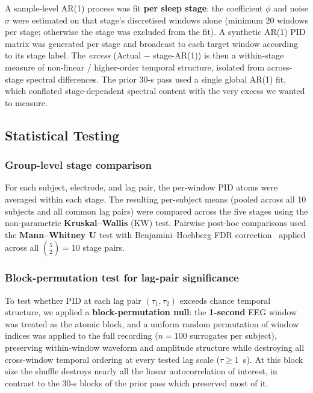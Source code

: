 \documentclass[11pt,a4paper]{article}
\begin{document}
A sample-level AR(1) process was fit \textbf{per sleep stage}: the
coefficient $\phi$ and noise $\sigma$ were estimated on that stage's
discretised windows alone (minimum 20 windows per stage; otherwise the stage
was excluded from the fit).  A synthetic AR(1) PID matrix was generated per
stage and broadcast to each target window according to its stage label.
The \emph{excess} (Actual $-$ stage-AR(1)) is then a within-stage measure of
non-linear / higher-order temporal structure, isolated from across-stage
spectral differences.  The prior 30-s pass used a single global AR(1) fit,
which conflated stage-dependent spectral content with the very excess we
wanted to measure.

\subsection{Statistical Testing}

\subsubsection{Group-level stage comparison}

For each subject, electrode, and lag pair, the per-window PID atoms were
averaged within each stage.  The resulting per-subject means (pooled across
all 10 subjects and all common lag pairs) were compared across the five
stages using the non-parametric \textbf{Kruskal--Wallis} (KW) test.
Pairwise post-hoc comparisons used the \textbf{Mann--Whitney U} test with
Benjamini--Hochberg FDR correction~\citep{benjamini1995fdr} applied across
all $\binom{5}{2} = 10$ stage pairs.

\subsubsection{Block-permutation test for lag-pair significance}
\label{sec:blockperm}

To test whether PID at each lag pair $(\tau_1, \tau_2)$ exceeds chance
temporal structure, we applied a \textbf{block-permutation null}: the
\textbf{1-second} EEG window was treated as the atomic block, and a uniform
random permutation of window indices was applied to the full recording
($n = 100$ surrogates per subject), preserving within-window waveform and
amplitude structure while destroying all cross-window temporal ordering at
every tested lag scale ($\tau \geq 1$~s).  At this block size the shuffle
destroys nearly all the linear autocorrelation of interest, in contrast to
the 30-s blocks of the prior pass which preserved most of it.
\end{document}
